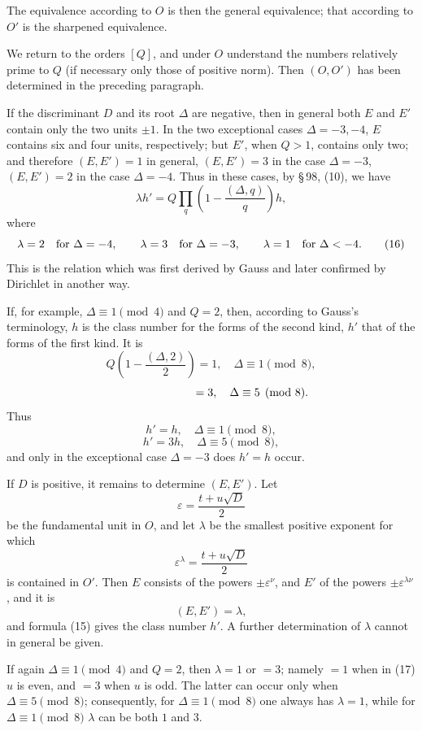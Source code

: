 \documentclass[11pt]{article}
\begin{document}
The equivalence according to \(O\) is then the general equivalence; that according to \(O'\) is the sharpened equivalence.

We return to the orders \([Q]\), and under \(O\) understand the numbers relatively prime to \(Q\) (if necessary only those of positive norm). Then \((O,O')\) has been determined in the preceding paragraph.

If the discriminant \(D\) and its root \(\Delta\) are negative, then in general both \(E\) and \(E'\) contain only the two units \(\pm1\). In the two exceptional cases \(\Delta=-3,-4\), \(E\) contains six and four units, respectively; but \(E'\), when \(Q>1\), contains only two; and therefore \((E,E')=1\) in general, \((E,E')=3\) in the case \(\Delta=-3\), \((E,E')=2\) in the case \(\Delta=-4\). Thus in these cases, by \S\,98, (10), we have
\begin{equation}
 \lambda h'=Q\prod_q\left(1-\frac{(\Delta,q)}{q}\right)h,
\tag{15}
\end{equation}
where
\begin{equation}
 \lambda=2\quad\hbox{for }\Delta=-4,\qquad
 \lambda=3\quad\hbox{for }\Delta=-3,\qquad
 \lambda=1\quad\hbox{for }\Delta<-4.
\tag{16}
\end{equation}
This is the relation which was first derived by Gauss and later confirmed by Dirichlet in another way.

If, for example, \(\Delta\equiv1\pmod4\) and \(Q=2\), then, according to Gauss's terminology, \(h\) is the class number for the forms of the second kind, \(h'\) that of the forms of the first kind. It is
\[
 Q\left(1-\frac{(\Delta,2)}{2}\right)=1,\quad \Delta\equiv1\pmod8,
\]
\[
 \hphantom{Q\left(1-\frac{(\Delta,2)}{2}\right)}=3,\quad \Delta\equiv5\pmod8.
\]
Thus
\[
 h'=h,\quad \Delta\equiv1\pmod8,
\]
\[
 h'=3h,\quad \Delta\equiv5\pmod8,
\]
and only in the exceptional case \(\Delta=-3\) does \(h'=h\) occur.

If \(D\) is positive, it remains to determine \((E,E')\). Let
\[
 \varepsilon=\frac{t+u\sqrt D}{2}
\]
be the fundamental unit in \(O\), and let \(\lambda\) be the smallest positive exponent for which
\[
 \varepsilon^\lambda=\frac{t+u\sqrt D}{2}
\]
is contained in \(O'\). Then \(E\) consists of the powers \(\pm\varepsilon^\nu\), and \(E'\) of the powers \(\pm\varepsilon^{\lambda\nu}\), and it is
\[
 (E,E')=\lambda,
\]
and formula (15) gives the class number \(h'\). A further determination of \(\lambda\) cannot in general be given.

If again \(\Delta\equiv1\pmod4\) and \(Q=2\), then \(\lambda=1\) or \(=3\); namely \(=1\) when in (17) \(u\) is even, and \(=3\) when \(u\) is odd. The latter can occur only when \(\Delta\equiv5\pmod8\); consequently, for \(\Delta\equiv1\pmod8\) one always has \(\lambda=1\), while for \(\Delta\equiv1\pmod8\) \(\lambda\) can be both \(1\) and \(3\).
\end{document}
